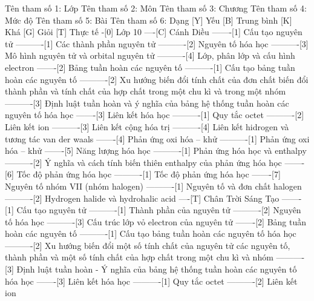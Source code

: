 %
%
%
%
%
Tên tham số 1: Lớp
Tên tham số 2: Môn
Tên tham số 3: Chương
Tên tham số 4: Mức độ
Tên tham số 5: Bài
Tên tham số 6: Dạng
%
%
[Y] Yếu
[B] Trung bình
[K] Khá
[G] Giỏi
[T] Thực tế
%
%
-[0] Lớp 10
----[C] Cánh Diều
-------[1] Cấu tạo nguyên tử
----------[1] Các thành phần nguyên tử
----------[2] Nguyên tố hóa học
----------[3] Mô hình nguyên tử và orbital nguyên tử
----------[4] Lớp, phân lớp và cấu hình electron
-------[2] Bảng tuần hoàn các nguyên tố
----------[1] Cấu tạo bảng tuần hoàn các nguyên tố
----------[2] Xu hướng biến đổi tính chất của đơn chất biến đổi thành phần và tính chất của hợp chất trong một chu kì và trong một nhóm
----------[3] Định luật tuần hoàn và ý nghĩa của bảng hệ thống tuần hoàn các nguyên tố hóa học
-------[3] Liên kết hóa học
----------[1] Quy tắc octet
----------[2] Liên kết ion
----------[3] Liên kết cộng hóa trị
----------[4] Liên kết hidrogen và tương tác van der waals 
-------[4] Phản ứng oxi hóa – khử
----------[1] Phản ứng oxi hóa – khử
-------[5] Năng lượng hóa học
----------[1] Phản ứng hóa học và enthalpy
----------[2] Ý nghĩa và cách tính biến thiên enthalpy của phản ứng hóa học
-------[6] Tốc độ phản ứng hóa học
----------[1] Tốc độ phản ứng hóa học
-------[7] Nguyên tố nhóm VII (nhóm halogen)
----------[1] Nguyên tố và đơn chất halogen
----------[2] Hydrogen halide và hydrohalic acid
----[T] Chân Trời Sáng Tạo
-------[1] Cấu tạo nguyên tử
----------[1] Thành phần của nguyên tử
----------[2] Nguyên tố hóa học
----------[3] Cấu trúc lớp vỏ electron của nguyên tử
-------[2] Bảng tuần hoàn các nguyên tố
----------[1] Cấu tạo bảng tuần hoàn các nguyên tố hóa học
----------[2] Xu hướng biến đổi một số tính chất của nguyên tử các nguyên tố, thành phần và một số tính chất của hợp chất trong một chu kì và nhóm
----------[3] Định luật tuần hoàn - Ý nghĩa của bảng hệ thống tuần hoàn các nguyên tố hóa học
-------[3] Liên kết hóa học
----------[1] Quy tắc octet
----------[2] Liên kết ion
